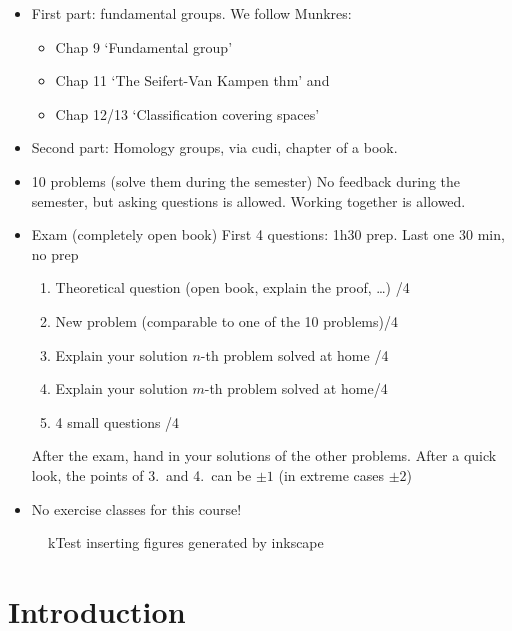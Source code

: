 

\begin{itemize}
    \item First part: fundamental groups. We follow Munkres:
        \begin{itemize}
            \item Chap 9 `Fundamental group'
            \item Chap 11 `The Seifert-Van Kampen thm' and
            \item Chap 12/13 `Classification covering spaces'
        \end{itemize}
    \item Second part: Homology groups, via cudi, chapter of a book.
    \item 10 problems (solve them during the semester) No feedback during the semester, but asking questions is allowed. Working together is allowed.
    \item Exam (completely open book) First 4 questions: 1h30 prep. Last one 30 min, no prep
        \begin{enumerate}
            \item Theoretical question (open book, explain the proof, \ldots) \hfill /4
            \item New problem (comparable to one of the 10 problems)\hfill /4
            \item Explain your solution $n$-th problem solved at home \hfill /4
            \item Explain your solution $m$-th problem solved at home\hfill /4
            \item 4 small questions \hfill /4
        \end{enumerate}
        After the exam, hand in your solutions of the other problems. After a quick look, the points of 3.\ and 4.\ can be $\pm 1$ (in extreme cases $\pm 2$)
    \item No exercise classes for this course!
\end{itemize}

\begin{figure}[H]
    \centering
    \caption{kTest inserting figures generated by inkscape}
    \label{fig:kTest_drawing}
\end{figure}

\setcounter{chapter}{-1}
\chapter{Introduction}

